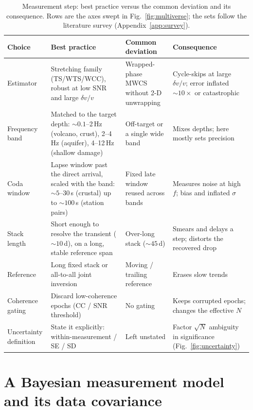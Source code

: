 \documentclass[
  referee]{gji}
\providecommand{\dvv}{\ensuremath{\delta v/v}}
\begin{document}
\begin{table}
\footnotesize
\caption{Measurement step: best practice versus the common deviation and its
consequence. Rows are the axes swept in Fig.~\ref{fig:multiverse}; the sets
follow the literature survey (Appendix~\ref{app:survey}).}
\label{tab:bp-measure}
\begin{tabularx}{\textwidth}{@{}>{\raggedright\arraybackslash}p{2.5cm} L L L@{}}
\toprule
\textbf{Choice} & \textbf{Best practice} & \textbf{Common deviation} &
\textbf{Consequence} \\
\midrule
Estimator & Stretching family (TS/WTS/WCC), robust at low SNR and large \dvv\
\citep{Mikesell2015,Yuan2021} & Wrapped-phase MWCS \citep{Clarke2011} without 2-D
unwrapping \citep{Mao2020} & Cycle-skips at large \dvv; error inflated
$\sim\!10\times$ or catastrophic \\ \hline
Frequency band & Matched to the target depth: $\sim\!0.1$--2\,Hz (volcano, crust),
2--4\,Hz (aquifer), 4--12\,Hz (shallow damage) \citep{Obermann2013,Obermann2016} &
Off-target or a single wide band & Mixes depths; here mostly sets precision \\ \hline
Coda window & Lapse window past the direct arrival, scaled with the band:
$\sim\!5$--30\,s (crustal) up to $\sim\!100$\,s (station pairs) \citep{Obermann2013} &
Fixed late window reused across bands & Measures noise at high $f$; bias and
inflated $\sigma$ \\ \hline
Stack length & Short enough to resolve the transient ($\sim\!10$\,d), on a long,
stable reference span \citep{Wang2017} & Over-long stack ($\sim\!45$\,d) & Smears and
delays a step; distorts the recovered drop \\ \hline
Reference & Long fixed stack or all-to-all joint inversion
\citep{Brenguier2014,Wang2017} & Moving / trailing reference & Erases slow trends \\ \hline
Coherence gating & Discard low-coherence epochs (CC / SNR threshold)
\citep{Clarke2011} & No gating & Keeps corrupted epochs; changes the effective $N$ \\ \hline
Uncertainty definition & State it explicitly: within-measurement
\citep{Weaver2011,Clarke2011} / SE / SD & Left unstated & Factor $\sqrt{N}$
ambiguity in significance (Fig.~\ref{fig:uncertainty}) \\
\bottomrule
\end{tabularx}
\end{table}

\section{A Bayesian measurement model and its data
covariance}\label{sec:bayes}
\end{document}
